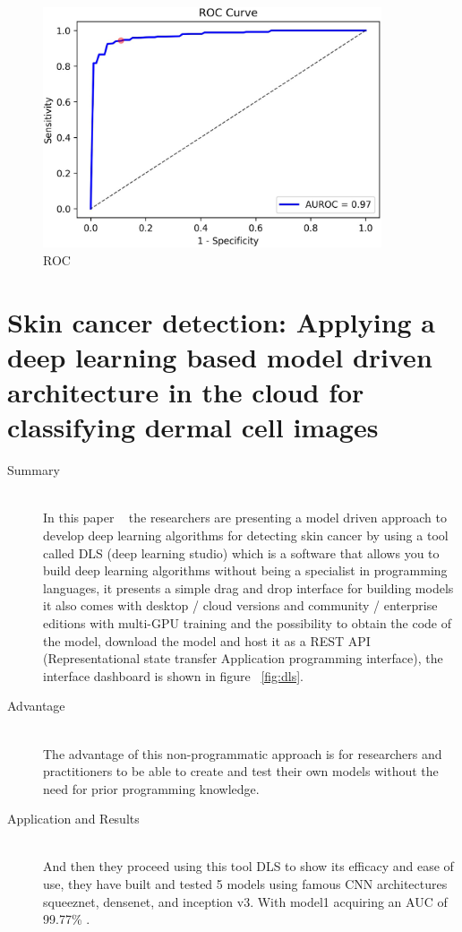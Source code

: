 \begin{figure}[htbp]
\begin{center}
\includegraphics[width=10cm]{./chapter-03-state-of-the-art/ROC.png}
\end{center}
\caption{ROC}
\label{fig:roc}
\end{figure}







\section{Skin cancer detection: Applying a deep learning based model driven architecture in the cloud for classifying dermal cell images}
\begin{description}
\item[Summary] \hfill \\
In this paper ~\cite{Kadampur2020} the researchers are presenting a model driven approach to develop deep learning algorithms for detecting skin cancer by using a tool called DLS (deep learning studio) which is a software that allows you to build deep learning algorithms without being a specialist in programming languages, it presents a simple drag and drop interface for building models it also comes with desktop / cloud versions and community / enterprise editions with multi-GPU training and the possibility to obtain the code of the model, download the model and host it as a REST API (Representational state transfer Application programming interface), the interface dashboard is shown in figure ~\ref{fig:dls}.
\item[Advantage] \hfill \\
The advantage of this non-programmatic approach is for researchers and practitioners to be able to create and test their own models without the need for prior programming knowledge.
\item[Application and Results] \hfill \\
And then they proceed using this tool DLS to show its efficacy and ease of use, they have built and tested 5 models using famous CNN architectures squeeznet, densenet, and inception v3.
With model1 acquiring an AUC of 99.77\% .
\end{description}


